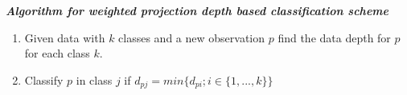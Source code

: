 \documentclass{article}
\begin{document}
\textbf{\textit{Algorithm for weighted projection depth based classification scheme}}

\begin{enumerate}

\item Given data with $k$ classes and a new observation $p$ find the data depth for $p$ for each class $k$.

\item Classify $p$ in class $j$ if $d_{pj} = min\{d_{pi}; i\in\{1,...,k\}\}$


\end{enumerate}
\end{document}
